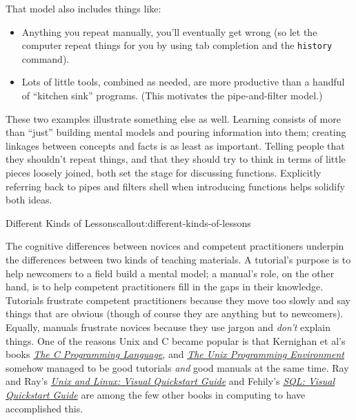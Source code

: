 That model also includes things like:

\begin{itemize}
\item
  Anything you repeat manually, you'll eventually get wrong (so let the
  computer repeat things for you by using tab completion and the
  \texttt{history} command).
\item
  Lots of little tools, combined as needed, are more productive than a
  handful of ``kitchen sink'' programs. (This motivates the
  pipe-and-filter model.)
\end{itemize}

These two examples illustrate something else as well. Learning consists
of more than ``just'' building mental models and pouring information
into them; creating linkages between concepts and facts is as least as
important. Telling people that they shouldn't repeat things, and that
they should try to think in terms of little pieces loosely joined, both
set the stage for discussing functions. Explicitly referring back to
pipes and filters shell when introducing functions helps solidify both
ideas.

\begin{callout}{Different Kinds of Lessons}{callout:different-kinds-of-lessons}

The cognitive differences between novices and competent practitioners
underpin the differences between two kinds of teaching materials. A
tutorial's purpose is to help newcomers to a field build a mental model;
a manual's role, on the other hand, is to help competent practitioners
fill in the gaps in their knowledge. Tutorials frustrate competent
practitioners because they move too slowly and say things that are
obvious (though of course they are anything but to newcomers). Equally,
manuals frustrate novices because they use jargon and \emph{don't}
explain things. One of the reasons Unix and C became popular is that
Kernighan et al's books
\emph{\href{http://www.amazon.com/Programming-Language-Brian-W-Kernighan/dp/0131103628/}{The
C Programming Language}}, and
\emph{\href{http://www.amazon.com/Unix-Programming-Environment-Prentice-Hall-Software/dp/013937681X/}{The
Unix Programming Environment}} somehow managed to be good tutorials
\emph{and} good manuals at the same time. Ray and Ray's
\emph{\href{http://www.amazon.com/Unix-Linux-Visual-QuickStart-Guide/dp/0321997549/}{Unix
and Linux: Visual Quickstart Guide}} and Fehily's
\emph{\href{http://www.amazon.com/SQL-Visual-QuickStart-Guide-3rd/dp/0321553578/}{SQL:
Visual Quickstart Guide}} are among the few other books in computing to
have accomplished this.
\end{callout}

